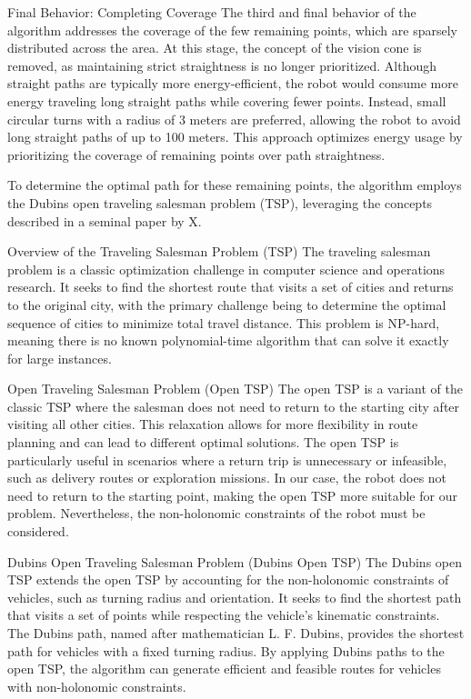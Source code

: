Final Behavior: Completing Coverage
The third and final behavior of the algorithm addresses the coverage of the few remaining points, which are sparsely distributed across the area. At this stage, the concept of the vision cone is removed, as maintaining strict straightness is no longer prioritized. Although straight paths are typically more energy-efficient, the robot would consume more energy traveling long straight paths while covering fewer points. Instead, small circular turns with a radius of 3 meters are preferred, allowing the robot to avoid long straight paths of up to 100 meters. This approach optimizes energy usage by prioritizing the coverage of remaining points over path straightness.

\vspace*{6mm}   

To determine the optimal path for these remaining points, the algorithm employs the Dubins open traveling salesman problem (TSP), leveraging the concepts described in a seminal paper by X.

\vspace*{6mm}   

Overview of the Traveling Salesman Problem (TSP)
The traveling salesman problem is a classic optimization challenge in computer science and operations research. It seeks to find the shortest route that visits a set of cities and returns to the original city, with the primary challenge being to determine the optimal sequence of cities to minimize total travel distance. This problem is NP-hard, meaning there is no known polynomial-time algorithm that can solve it exactly for large instances.

\vspace*{6mm}   

Open Traveling Salesman Problem (Open TSP)
The open TSP is a variant of the classic TSP where the salesman does not need to return to the starting city after visiting all other cities. This relaxation allows for more flexibility in route planning and can lead to different optimal solutions. The open TSP is particularly useful in scenarios where a return trip is unnecessary or infeasible, such as delivery routes or exploration missions. In our case, the robot does not need to return to the starting point, making the open TSP more suitable for our problem. Nevertheless, the non-holonomic constraints of the robot must be considered.

\vspace*{6mm}   

Dubins Open Traveling Salesman Problem (Dubins Open TSP)
The Dubins open TSP extends the open TSP by accounting for the non-holonomic constraints of vehicles, such as turning radius and orientation. It seeks to find the shortest path that visits a set of points while respecting the vehicle's kinematic constraints. The Dubins path, named after mathematician L. F. Dubins, provides the shortest path for vehicles with a fixed turning radius. By applying Dubins paths to the open TSP, the algorithm can generate efficient and feasible routes for vehicles with non-holonomic constraints.

